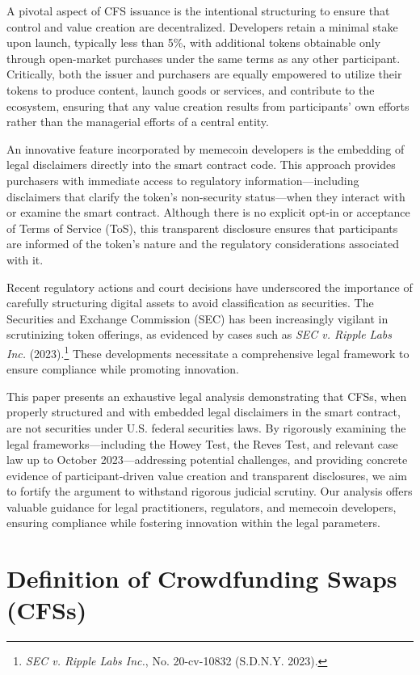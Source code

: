 \documentclass[a4paper,12pt]{article}
\begin{document}
A pivotal aspect of CFS issuance is the intentional structuring to ensure that control and value creation are decentralized. Developers retain a minimal stake upon launch, typically less than 5\%, with additional tokens obtainable only through open-market purchases under the same terms as any other participant. Critically, both the issuer and purchasers are equally empowered to utilize their tokens to produce content, launch goods or services, and contribute to the ecosystem, ensuring that any value creation results from participants' own efforts rather than the managerial efforts of a central entity.

An innovative feature incorporated by memecoin developers is the embedding of legal disclaimers directly into the smart contract code. This approach provides purchasers with immediate access to regulatory information—including disclaimers that clarify the token's non-security status—when they interact with or examine the smart contract. Although there is no explicit opt-in or acceptance of Terms of Service (ToS), this transparent disclosure ensures that participants are informed of the token's nature and the regulatory considerations associated with it.

Recent regulatory actions and court decisions have underscored the importance of carefully structuring digital assets to avoid classification as securities. The Securities and Exchange Commission (SEC) has been increasingly vigilant in scrutinizing token offerings, as evidenced by cases such as \emph{SEC v. Ripple Labs Inc.} (2023).\footnote{\emph{SEC v. Ripple Labs Inc.}, No. 20-cv-10832 (S.D.N.Y. 2023).} These developments necessitate a comprehensive legal framework to ensure compliance while promoting innovation.

This paper presents an exhaustive legal analysis demonstrating that CFSs, when properly structured and with embedded legal disclaimers in the smart contract, are not securities under U.S. federal securities laws. By rigorously examining the legal frameworks—including the Howey Test, the Reves Test, and relevant case law up to October 2023—addressing potential challenges, and providing concrete evidence of participant-driven value creation and transparent disclosures, we aim to fortify the argument to withstand rigorous judicial scrutiny. Our analysis offers valuable guidance for legal practitioners, regulators, and memecoin developers, ensuring compliance while fostering innovation within the legal parameters.

\section{Definition of Crowdfunding Swaps (CFSs)}
\end{document}
